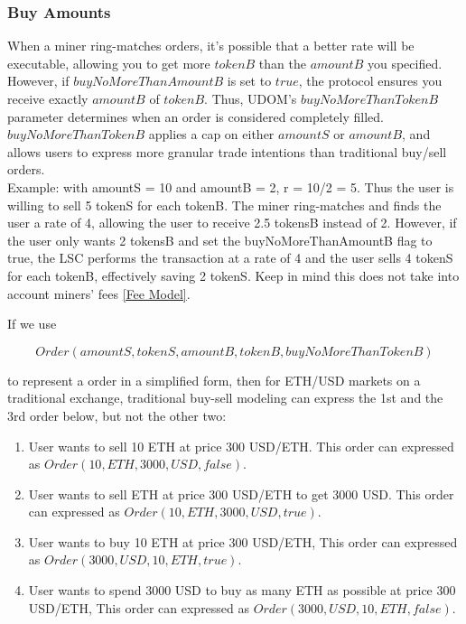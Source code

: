 \documentclass[UTF8,nofonts]{article}
\begin{document}
\subsubsection{Buy Amounts}
When a miner ring-matches orders, it's possible that a better rate will be executable, allowing you to get more $tokenB$ than the $amountB$ you specified. However, if $buyNoMoreThanAmountB$ is set to $true$, the protocol ensures you receive exactly $amountB$ of $tokenB$. Thus, UDOM's $buyNoMoreThanTokenB$ parameter determines when an order is considered completely filled. $buyNoMoreThanTokenB$ applies a cap on either $amountS$ or $amountB$, and allows users to express more granular trade intentions than traditional buy/sell orders.\\

Example: with amountS = 10 and amountB = 2, r = 10/2 = 5. Thus the user is willing to sell 5 tokenS for each tokenB. The miner ring-matches and finds the user a rate of 4, allowing the user to receive 2.5 tokensB instead of 2. However, if the user only wants 2 tokensB and set the buyNoMoreThanAmountB flag to true, the LSC performs the transaction at a rate of 4 and the user sells 4 tokenS for each tokenB, effectively saving 2 tokenS. Keep in mind this does not take into account miners' fees \ref{Fee Model}.

If we use

\begin{equation}
	Order(amountS, tokenS, amountB, tokenB, buyNoMoreThanTokenB)
\end{equation}

to represent a order in a simplified form, then for ETH/USD markets on a traditional exchange, traditional buy-sell modeling can express the 1st and the 3rd order below, but not the other two:

\begin{enumerate}
	\item User wants to sell 10 ETH at price 300 USD/ETH. This order can expressed as $Order(10, ETH, 3000, USD, false)$.
	\item User wants to sell ETH at price 300 USD/ETH to get 3000 USD. This order can expressed as $Order(10, ETH, 3000, USD, true)$.
	\item User wants to buy 10 ETH at price 300 USD/ETH, This order can expressed as $Order(3000, USD, 10, ETH, true)$.
	\item User wants to spend 3000 USD to buy as many ETH as possible at price 300 USD/ETH, This order can expressed as $Order(3000, USD, 10, ETH, false)$.
\end{enumerate}
\end{document}
